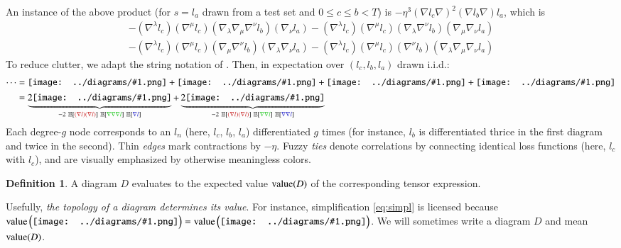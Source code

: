 \documentclass{article}
\theoremstyle{plain}
\theoremstyle{definition}
\newtheorem{defn}{Definition}
\newcommand{\dvalue}{\text{\textnormal{value}}}
\newcommand{\expct}[1]{\mathbb{E}\left[#1\right]}
\newcommand{\wrap}[1]{\left(#1\right)}
\newcommand{\sdia}[1]{\begin{gathered}\texttt{[image: ../diagrams/\#1.png]}\end{gathered}}
\begin{document}
        An instance of the above product (for $s=l_a$ drawn from a test set and
        $0\leq c\leq b<T$) is $-\eta^3 (\nabla l_c \nabla)^2 (\nabla l_b
        \nabla) l_a$, which is
        {\small
        \begin{align*}
            - (\nabla^\lambda l_c) (\nabla^\mu l_c) (\nabla_\lambda \nabla_\mu \nabla^\nu l_b) (\nabla_\nu l_a)   
            - (\nabla^\lambda l_c) (\nabla^\mu l_c) (\nabla_\lambda \nabla^\nu l_b) (\nabla_\mu \nabla_\nu l_a) \\
            - (\nabla^\lambda l_c) (\nabla^\mu l_c) (\nabla_\mu \nabla^\nu l_b) (\nabla_\lambda \nabla_\nu l_a)   
            - (\nabla^\lambda l_c) (\nabla^\mu l_c) (\nabla^\nu l_b) (\nabla_\lambda \nabla_\mu \nabla_\nu l_a)
        \end{align*}
        }
        To reduce clutter, we adapt the string notation of \citet{fe49, pe71}.
        Then, in expectation over $(l_c, l_b, l_a)$ drawn i.i.d.:
        \begin{align}
            \cdots
            &= 
                 \sdia{(01-2-3)(02-12-23)}
                +\sdia{(01-2-3)(02-13-23)}
                +\sdia{(01-2-3)(03-12-23)}
                +\sdia{(01-2-3)(03-13-23)} \\
                \label{eq:simpl}
            &=
                \underbrace{2\sdia{(01-2-3)(02-12-23)}}_{
                   -2~\expct{{\color{moor}(\nabla l)(\nabla l)}}~\expct{{\color{moog}\nabla\nabla\nabla l}}~\expct{{\color{moob} \nabla l}}
                }
                +
                \underbrace{2\sdia{(01-2-3)(02-13-23)}}_{
                   -2~\expct{{\color{moor}(\nabla l)(\nabla l)}}~\expct{{\color{moog}\nabla \nabla l}}~\expct{{\color{moob}\nabla \nabla l}}
                }
        \end{align}
        Each degree-$g$ node corresponds to an $l_n$ (here,
            {\color{moor} $l_c$},
            {\color{moog} $l_b$},
            {\color{moob} $l_a$}) differentiated $g$ times
        (for instance, {\color{moog} $l_b$} is differentiated thrice in the
        first diagram and twice in the second).  Thin \emph{edges} mark
        contractions by $-\eta$.  Fuzzy \emph{ties} denote correlations by
        connecting identical loss functions (here, {\color{moor} $l_c$} with
        {\color{moor} $l_c$}), and are visually emphasized by otherwise
        meaningless colors.
        \begin{defn}
            A diagram $D$ evaluates to the expected value
            $\dvalue(D)$ of the corresponding tensor expression.
        \end{defn}
        Usefully, %
        \emph{the topology of a diagram determines its value}.  For instance,
        simplification \ref{eq:simpl} is licensed because
        $
            \dvalue\wrap{\sdia{(01-2-3)(02-12-23)}}
            =
            \dvalue\wrap{\sdia{(01-2-3)(03-13-23)}}
        $.
        We will sometimes write a diagram $D$ and mean $\dvalue(D)$. 
    
\end{document}
